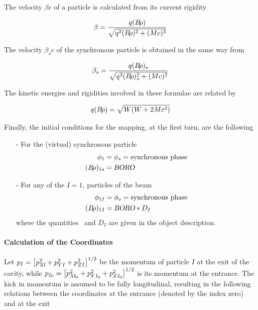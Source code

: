 {\noindent The velocity $ \beta c $ of a particle is calculated from its
current rigidity

$$ \beta  = \dfrac{q(B\!\rho ) }{ \sqrt{ q^2(B\!\rho )^2+(Mc)^2}} $$

\noindent  The velocity $ \beta_ sc $ of the synchronous particle is obtained
in the same way from

$$ \beta_ s = \dfrac{q(B\!\rho )_s }{ \sqrt{ q^2(B\!\rho )^2_s + (Mc)^2}} $$

\noindent  The kinetic energies and rigidities involved in these formulae are related by

$$ q(B\!\rho ) = \sqrt{ W(W+2Mc^2)} $$

\noindent  Finally, the initial conditions for the mapping, at the first 
turn, are the following  
\begin{itemize}
\item[-] For the (virtual) synchronous particle
%
\begin{align*}
	\phi_ 1 &  = \phi_ s = \text{synchronous phase}  \\
	(B\!\rho )_{1s} & = \textsl{BORO}  
\end{align*}

\item[-] For any of the $ I=1$,  \IMAX{}  particles of the beam 
%
\begin{align*}
	\phi_{1I} & = \phi_ s = \text{synchronous  phase} \\
	(B\!\rho )_{1I} & =\textsl{BORO} \ast  D_I
\end{align*}
%
\noindent where the quantities \BORO\ and $ D_I $ are given in the object description. 
\end{itemize}

\paragraph{Calculation of the Coordinates} 

\noindent Let   $ p_I= \left[p^2_{\textsl{XI}}+p^2_{YI}+p^2_{ZI} \right]^{1/2} $ be the momentum of particle 
$ I $ at the exit of the cavity, while   %
$ p_{I_0}= \left[p^2_{\textsl{XI}_0}+p^2_{YI_0} + p^2_{ZI_0}\right]^{1/2} $ is its 
momentum at the entrance. The kick in momentum is assumed to be 
fully longitudinal, resulting in the following relations between 
the coordinates at the entrance (denoted by the index zero) and at the exit 

}
